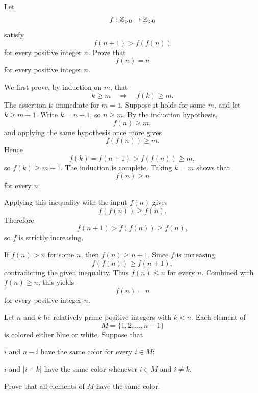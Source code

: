     \begin{expectedproblem}[1977 IMO]
        Let
        \[
            f:\mathbb{Z}_{>0}\to\mathbb{Z}_{>0}
        \]
        satisfy
        \[
            f(n+1)>f(f(n))
        \]
        for every positive integer $n$. Prove that
        \[
            f(n)=n
        \]
        for every positive integer $n$.
    \end{expectedproblem}

    \begin{solution}
        We first prove, by induction on $m$, that
        \[
            k\geq m
            \quad\Longrightarrow\quad
            f(k)\geq m.
        \]
        The assertion is immediate for $m=1$. Suppose it holds for some $m$,
        and let $k\geq m+1$. Write $k=n+1$, so $n\geq m$. By the induction
        hypothesis,
        \[
            f(n)\geq m,
        \]
        and applying the same hypothesis once more gives
        \[
            f(f(n))\geq m.
        \]
        Hence
        \[
            f(k)=f(n+1)>f(f(n))\geq m,
        \]
        so $f(k)\geq m+1$. The induction is complete. Taking $k=m$ shows that
        \[
            f(n)\geq n
        \]
        for every $n$.

        Applying this inequality with the input $f(n)$ gives
        \[
            f(f(n))\geq f(n).
        \]
        Therefore
        \[
            f(n+1)>f(f(n))\geq f(n),
        \]
        so $f$ is strictly increasing.

        If $f(n)>n$ for some $n$, then $f(n)\geq n+1$. Since $f$ is
        increasing,
        \[
            f(f(n))\geq f(n+1),
        \]
        contradicting the given inequality. Thus $f(n)\leq n$ for every $n$.
        Combined with $f(n)\geq n$, this yields
        \[
            \boxed{f(n)=n}
        \]
        for every positive integer $n$.
    \end{solution}

    \begin{expectedproblem}[1985 IMO]
        Let $n$ and $k$ be relatively prime positive integers with $k<n$. Each
        element of
        \[
            M=\{1,2,\ldots,n-1\}
        \]
        is colored either blue or white. Suppose that
        \begin{problemchoices}
            \item $i$ and $n-i$ have the same color for every $i\in M$;
            \item $i$ and $|i-k|$ have the same color whenever
                  $i\in M$ and $i\neq k$.
        \end{problemchoices}
        Prove that all elements of $M$ have the same color.
    \end{expectedproblem}

